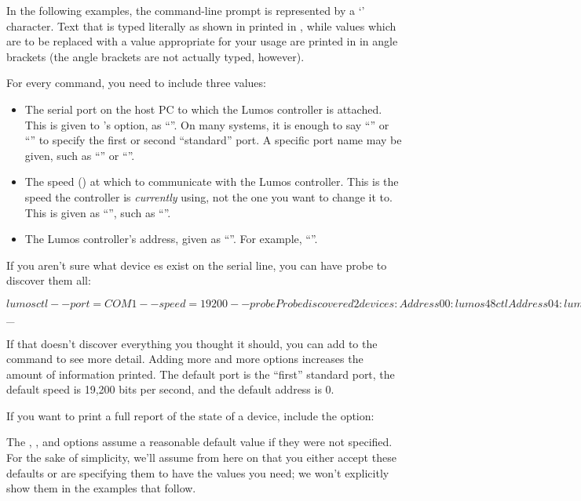 \documentclass[letterpaper,twoside,onecolumn,openright,final]{memoir}
\begin{document}
In the following examples, the command-line prompt is represented by a `\z{\$}' character.
Text that is typed literally as shown in printed in , while values which are
to be replaced with a value appropriate for your usage are printed in  in angle brackets
(the angle brackets are not actually typed, however).

For every command, you need to include three values:
\begin{itemize}
	\item 	The serial port on the host PC to which the Lumos controller is attached.  This is
		given to 's  option, as ``''.  On many
		systems, it is enough to say ``'' or ``'' to specify the first
		or second ``standard'' port.  A specific port name may be given, such as 
		``'' or ``''.
	\item	The speed () at which to communicate with the Lumos controller.  This is
		the speed the controller is \emph{currently} using, not the one you want to change it
		to.  This is given as ``'', such as ``''.
	\item	The Lumos controller's address, given as ``''.  For example,
		``''.
\end{itemize}

If you aren't sure what device es exist on the serial line, you can have  
probe to discover them all:
\begin{SourceCode}
$ lumosctl --port=COM1 --speed=19200 --probe
Probe discovered 2 devices:
Address 00: lumos48ctl
Address 04: lumos24dc
$ _
\end{SourceCode}

If that doesn't discover everything you thought it should, you can add  to the command
to see more detail.  Adding more and more  options increases the amount of information
printed.  The default port is the ``first'' standard port, the default speed is 19,200 bits per second,
and the default address is 0.

If you want to print a full report of the state of a device, include the  option:

The , , and  options assume a reasonable default value if
they were not specified.  For the sake of simplicity, we'll assume from here on that you either
accept these defaults or are specifying them to have the values you need; we won't explicitly
show them in the examples that follow.
\end{document}
